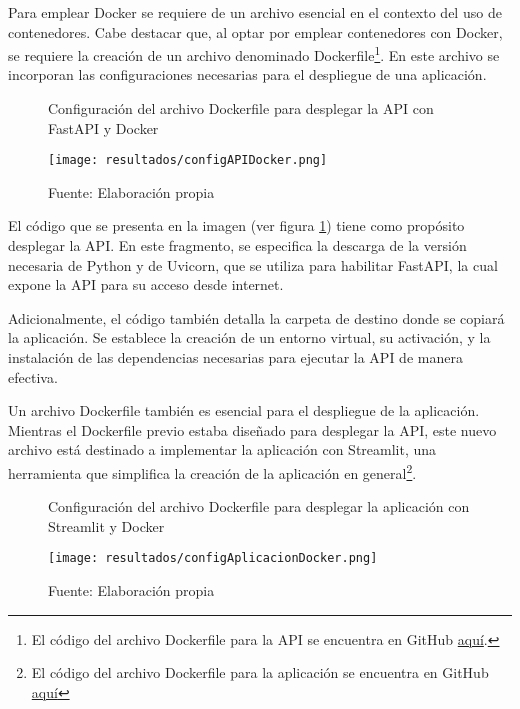 Para emplear Docker se requiere de un archivo esencial en el contexto del uso de contenedores. Cabe destacar que, al optar por emplear contenedores con Docker, se requiere la creación de un archivo denominado Dockerfile\footnote{El código del archivo Dockerfile para la API se encuentra en GitHub \href{https://github.com/juferoto/mlops_project/tree/master/application/src}{aquí}.}. En este archivo se incorporan las configuraciones necesarias para el despliegue de una aplicación.


\begin{figure}[h]
	\centering
	\caption{Configuración del archivo Dockerfile para desplegar la API con FastAPI y Docker}
	\texttt{[image: resultados/configAPIDocker.png]}
	\caption*{\footnotesize Fuente: Elaboración propia}
	\label{fig:figuraConfigAPIDocker}
\end{figure}

El código que se presenta en la imagen (ver figura \ref{fig:figuraConfigAPIDocker}) tiene como propósito desplegar la API. En este fragmento, se especifica la descarga de la versión necesaria de Python y de Uvicorn, que se utiliza para habilitar FastAPI, la cual expone la API para su acceso desde internet.

\newpage


Adicionalmente, el código también detalla la carpeta de destino donde se copiará la aplicación. Se establece la creación de un entorno virtual, su activación, y la instalación de las dependencias necesarias para ejecutar la API de manera efectiva. \newline

Un archivo Dockerfile también es esencial para el despliegue de la aplicación. Mientras el Dockerfile previo estaba diseñado para desplegar la API, este nuevo archivo está destinado a implementar la aplicación con Streamlit, una herramienta que simplifica la creación de la aplicación en general\footnote{El código del archivo Dockerfile para la aplicación se encuentra en GitHub \href{https://github.com/juferoto/mlops_project/tree/master/application/src/webapp}{aquí}}.

\begin{figure}[h]
	\centering
	\caption{Configuración del archivo Dockerfile para desplegar la aplicación con Streamlit y Docker}
	\texttt{[image: resultados/configAplicacionDocker.png]}
	\caption*{\footnotesize Fuente: Elaboración propia}
	\label{fig:figuraConfigAplicacionDocker}
\end{figure}

